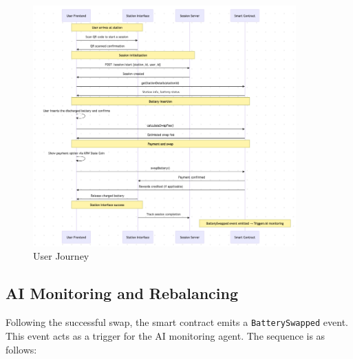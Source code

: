 \documentclass[12pt,a4paper]{article}
\begin{document}
\noindent
\begin{figure}[H]
    \centering
    \includegraphics[width=0.9\textwidth]{diagram1.png}
    \caption{User Journey}
\end{figure}

\subsection{AI Monitoring and Rebalancing}

Following the successful swap, the smart contract emits a \texttt{BatterySwapped} event. This event acts as a trigger for the AI monitoring agent. The sequence is as follows:
\end{document}
